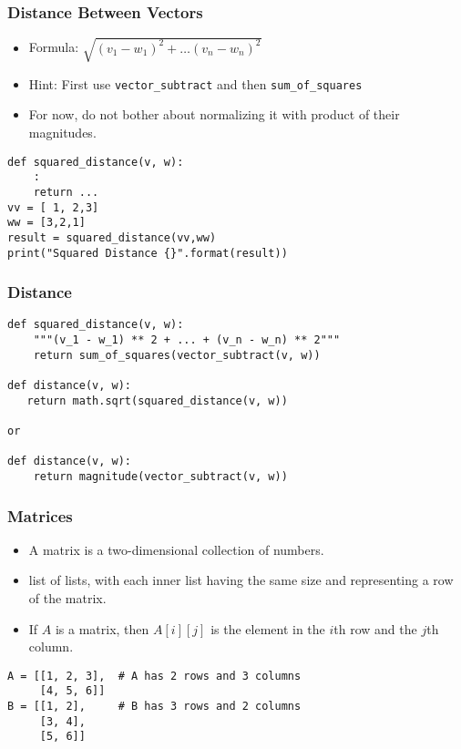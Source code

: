\begin{frame}[fragile]\frametitle{Distance Between Vectors}
\begin{itemize}
\item  Formula:
$ \sqrt{(v_1 - w_1)^2 + \ldots (v_n - w_n)^2}$
\item Hint: First use \lstinline|vector_subtract| and then \lstinline|sum_of_squares|
\item For now, do not bother about normalizing it with product of their magnitudes.

\end{itemize}
\begin{lstlisting}
def squared_distance(v, w):
	:
	return ...
vv = [ 1, 2,3]
ww = [3,2,1]
result = squared_distance(vv,ww)
print("Squared Distance {}".format(result))
\end{lstlisting}
\end{frame}

\begin{frame}[fragile]\frametitle{Distance}

\begin{lstlisting}
def squared_distance(v, w):
    """(v_1 - w_1) ** 2 + ... + (v_n - w_n) ** 2"""
    return sum_of_squares(vector_subtract(v, w))
    
def distance(v, w):
   return math.sqrt(squared_distance(v, w))

or

def distance(v, w):
    return magnitude(vector_subtract(v, w))
\end{lstlisting}
\end{frame}

\begin{frame}[fragile]\frametitle{Matrices}
\begin{itemize}
\item  A matrix is a two-dimensional collection of numbers. 
\item list of  lists, with each inner list having the same size and representing a row of the
matrix.
\item  If  $A$  is a matrix, then  $A[i][j]$  is the element in the $i$th row and the $j$th column.
\end{itemize}
\begin{lstlisting}
A = [[1, 2, 3],  # A has 2 rows and 3 columns
     [4, 5, 6]]
B = [[1, 2],     # B has 3 rows and 2 columns
     [3, 4],
     [5, 6]]
\end{lstlisting}
\end{frame}

